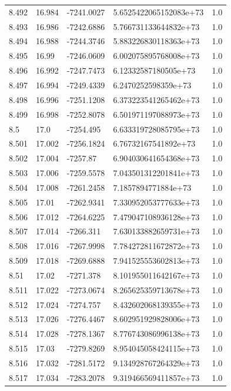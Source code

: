 \begin{tabular}{lllll}
8.492 & 16.984 & -7241.0027 & 5.6525422065152083e+73 & 1.0 \\
8.493 & 16.986 & -7242.6886 & 5.766731133644832e+73 & 1.0 \\
8.494 & 16.988 & -7244.3746 & 5.883226830118363e+73 & 1.0 \\
8.495 & 16.99 & -7246.0609 & 6.002075895768008e+73 & 1.0 \\
8.496 & 16.992 & -7247.7473 & 6.12332587180505e+73 & 1.0 \\
8.497 & 16.994 & -7249.4339 & 6.2470252598359e+73 & 1.0 \\
8.498 & 16.996 & -7251.1208 & 6.373223541265462e+73 & 1.0 \\
8.499 & 16.998 & -7252.8078 & 6.501971197088973e+73 & 1.0 \\
8.5 & 17.0 & -7254.495 & 6.633319728085795e+73 & 1.0 \\
8.501 & 17.002 & -7256.1824 & 6.76732167541892e+73 & 1.0 \\
8.502 & 17.004 & -7257.87 & 6.904030641654368e+73 & 1.0 \\
8.503 & 17.006 & -7259.5578 & 7.043501312201841e+73 & 1.0 \\
8.504 & 17.008 & -7261.2458 & 7.1857894771884e+73 & 1.0 \\
8.505 & 17.01 & -7262.9341 & 7.330952053777633e+73 & 1.0 \\
8.506 & 17.012 & -7264.6225 & 7.479047108936128e+73 & 1.0 \\
8.507 & 17.014 & -7266.311 & 7.630133882659731e+73 & 1.0 \\
8.508 & 17.016 & -7267.9998 & 7.784272811672872e+73 & 1.0 \\
8.509 & 17.018 & -7269.6888 & 7.941525553602813e+73 & 1.0 \\
8.51 & 17.02 & -7271.378 & 8.101955011642167e+73 & 1.0 \\
8.511 & 17.022 & -7273.0674 & 8.265625359713678e+73 & 1.0 \\
8.512 & 17.024 & -7274.757 & 8.432602068139355e+73 & 1.0 \\
8.513 & 17.026 & -7276.4467 & 8.602951929828006e+73 & 1.0 \\
8.514 & 17.028 & -7278.1367 & 8.776743086996138e+73 & 1.0 \\
8.515 & 17.03 & -7279.8269 & 8.954045058424115e+73 & 1.0 \\
8.516 & 17.032 & -7281.5172 & 9.134928767264329e+73 & 1.0 \\
8.517 & 17.034 & -7283.2078 & 9.319466569411857e+73 & 1.0 \\

\end{tabular}
